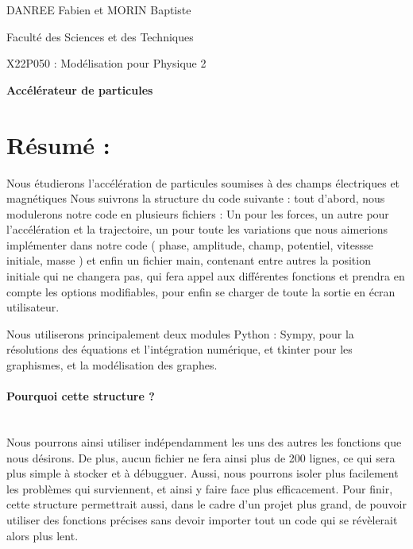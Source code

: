 \documentclass[a4paper,11pt]{article}			%
\begin{document}
\vspace*{-2cm}
\hfill DANREE Fabien et MORIN Baptiste
\vspace{1cm}

\centerline{\LARGE Faculté des Sciences et des Techniques}
\centerline{\LARGE X22P050 : Modélisation pour Physique  2 }  
\vspace*{0.5cm}

\centerline{\bf\Large Accélérateur de particules }
\vspace*{2cm}
\noindent

\section*{Résumé :}

Nous étudierons l’accélération de particules soumises à des champs électriques et magnétiques
\newline
\noindent
Nous suivrons la structure du code suivante : tout d'abord, nous modulerons notre code en plusieurs fichiers :
\newline
\noindent Un pour les forces, un autre pour l'accélération et la trajectoire, un pour toute les variations que nous aimerions implémenter dans notre code ( phase, amplitude, champ, potentiel, vitessse initiale, masse ) et enfin un fichier main, contenant entre autres la position initiale qui ne changera pas, qui fera appel aux différentes fonctions et prendra en compte les options modifiables, pour enfin se charger de toute la sortie en écran utilisateur.

Nous utiliserons principalement deux modules Python : Sympy, pour la résolutions des équations et l'intégration numérique, et tkinter pour les graphismes, et la modélisation des graphes.
\paragraph{Pourquoi cette structure ?}
~~\\
Nous pourrons ainsi utiliser indépendamment les uns des autres les fonctions que nous désirons. De plus, aucun fichier ne fera ainsi plus de 200 lignes, ce qui sera plus simple à stocker et à débugguer. Aussi, nous pourrons isoler plus facilement les problèmes qui surviennent, et ainsi y faire face plus efficacement.
\newline Pour finir, cette structure permettrait aussi, dans le cadre d'un projet plus grand, de pouvoir utiliser des fonctions précises sans devoir importer tout un code qui se révèlerait alors plus lent.
\end{document}
